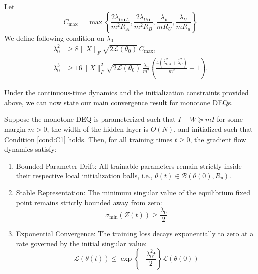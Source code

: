 \documentclass[twoside]{article}
\newcommand{\Lc}{\mathcal{L}}
\newcommand{\ub}{\mathbf{u}}
\begin{document}
\begin{condition}\label{cond:C1}
Let 
$$
C_{\max} = \max \left\{ 
    \frac{2\bar{\lambda}_{U\mathbf{u}A}}{m^2 R_A},
    \frac{2\bar{\lambda}_{U\mathbf{u}}}{m^2 R_B},
    \frac{\bar{\lambda}_{\mathbf{u}}}{m R_U},
    \frac{\bar{\lambda}_U}{m R_u}
\right\}
$$
We define following condition on $\lambda_0$
\begin{align}
  \lambda_0^2 &\geq 8\|X\|_F\sqrt{2\Lc(\theta_0)}\,C_{\max}, \tag{C1a}\label{eq:C1a}\\
  \lambda_0^3 &\geq 16\|X\|_F^2\sqrt{2\Lc(\theta_0)}\,\frac{\bar\lambda_\ub}{m^2}
              \!\left(\frac{4(\bar\lambda_{UA}^2+\bar\lambda_U^2)}{m^2}+1\right). \tag{C1b}\label{eq:C1b}
\end{align}
\end{condition}




Under the continuous-time dynamics and the initialization constraints provided above, we can now state our main convergence result for monotone DEQs.

\begin{theorem}
\label{theorem:main_continuous}
Suppose the monotone DEQ is parameterized such that $I - W \succeq mI$ for some margin $m > 0$, the width of the hidden layer is $O(N)$, and initialized such that Condition \ref{cond:C1} holds. Then, for all training times $t \ge 0$, the gradient flow dynamics satisfy:

\begin{enumerate}
    \item Bounded Parameter Drift: All trainable parameters remain strictly inside their respective local initialization balls, i.e., $\theta(t) \in \mathcal{B}(\theta(0), R_\theta)$.
    \item Stable Representation: The minimum singular value of the equilibrium fixed point remains strictly bounded away from zero:$$\sigma_{\min}(Z(t)) \ge \frac{\lambda_0}{2}$$
    \item Exponential Convergence: The training loss decays exponentially to zero at a rate governed by the initial singular value:
    \begin{equation}
        \mathcal{L}(\theta(t)) \le \exp\left\{ - \frac{\lambda_0^2 t}{2} \right\} \mathcal{L}(\theta(0))
        \label{eq:loss_converge_rate_continuous}
    \end{equation}
\end{enumerate}

\end{theorem}
\end{document}
